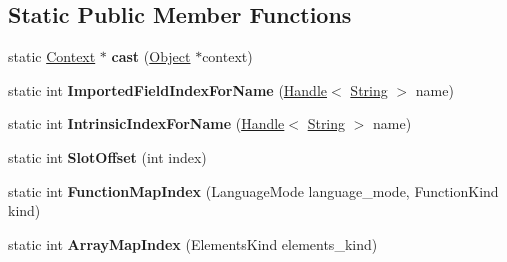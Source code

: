 \subsection*{Static Public Member Functions}
\begin{DoxyCompactItemize}
\item 
static \hyperlink{classv8_1_1internal_1_1_context}{Context} $\ast$ {\bfseries cast} (\hyperlink{classv8_1_1internal_1_1_object}{Object} $\ast$context)\hypertarget{classv8_1_1internal_1_1_context_a960ca0425fe81377f6a482496bb7d247}{}\label{classv8_1_1internal_1_1_context_a960ca0425fe81377f6a482496bb7d247}

\item 
static int {\bfseries Imported\+Field\+Index\+For\+Name} (\hyperlink{classv8_1_1internal_1_1_handle}{Handle}$<$ \hyperlink{classv8_1_1internal_1_1_string}{String} $>$ name)\hypertarget{classv8_1_1internal_1_1_context_aac21aeb693f1cca1783460a4515cdb7d}{}\label{classv8_1_1internal_1_1_context_aac21aeb693f1cca1783460a4515cdb7d}

\item 
static int {\bfseries Intrinsic\+Index\+For\+Name} (\hyperlink{classv8_1_1internal_1_1_handle}{Handle}$<$ \hyperlink{classv8_1_1internal_1_1_string}{String} $>$ name)\hypertarget{classv8_1_1internal_1_1_context_aee0b0ded909f741a2167a59109656d28}{}\label{classv8_1_1internal_1_1_context_aee0b0ded909f741a2167a59109656d28}

\item 
static int {\bfseries Slot\+Offset} (int index)\hypertarget{classv8_1_1internal_1_1_context_ac0da2ec757ff29e9e8b41d2febce8656}{}\label{classv8_1_1internal_1_1_context_ac0da2ec757ff29e9e8b41d2febce8656}

\item 
static int {\bfseries Function\+Map\+Index} (Language\+Mode language\+\_\+mode, Function\+Kind kind)\hypertarget{classv8_1_1internal_1_1_context_a8e11bc15b1fdd97dd7a118fe53055087}{}\label{classv8_1_1internal_1_1_context_a8e11bc15b1fdd97dd7a118fe53055087}

\item 
static int {\bfseries Array\+Map\+Index} (Elements\+Kind elements\+\_\+kind)\hypertarget{classv8_1_1internal_1_1_context_aba6adca649244f5a168e958be581502f}{}\label{classv8_1_1internal_1_1_context_aba6adca649244f5a168e958be581502f}

\end{DoxyCompactItemize}
